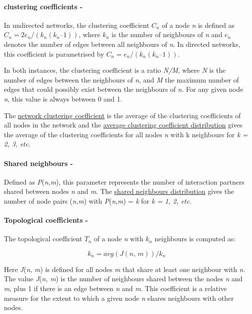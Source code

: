 \paragraph{clustering coefficients -}

In undirected networks, the clustering coefficient $C_n$ of a node \textit{n} is defined as $C_n = 2e_n/(k_n(k_n–1))$, where $k_n$ is the number of neighbours of \textit{n} and $e_n$ denotes the number of edges between all neighbours of \textit{n}. In directed networks, this coefficient is parametrised by $C_n = e_n/(k_n(k_n–1))$. 

In both instances, the clustering coefficient is a ratio \textit{N/M}, where \textit{N} is the number of edges between the neighbours of \textit{n}, and \textit{M} the maximum number of edges that could possibly exist between the neighbours of \textit{n}. For any given node \textit{n}, this value is always between 0 and 1. 

The \underline{network clustering coefficient} is the average of the clustering coefficients of all nodes in the network and the \underline{average clustering coefficient distribution} gives the average of the clustering coefficients for all nodes \textit{n} with k neighbours for \textit{k = 2, 3, etc}.  

\paragraph{Shared neighbours -}

Defined as \textit{P}(\textit{n,m}), this parameter represents the number of interaction partners shared between nodes \textit{n} and \textit{m}. The \underline{shared neighbours distribution} gives the number of node pairs (\textit{n,m}) with \textit{P}(\textit{n,m}) = \textit{k} for \textit{k = 1, 2, etc}. 

\paragraph{Topological coefficients -}

The topological coefficient $\textit{T}_n$ of a node \textit{n} with $\textit{k}_n$ neighbours is computed as: 

\begin{equation}
\textit{k}_n = avg (\textit{J}(\textit{n, m}))/\textit{k}_n
\end{equation}

Here \textit{J}(\textit{n, m}) is defined for all nodes \textit{m} that share at least one neighbour with \textit{n}. 
The value \textit{J}(\textit{n, m}) is the number of neighbours shared between the nodes \textit{n} and \textit{m}, plus 1 if there is an edge between \textit{n} and \textit{m}. This coefficient is a relative measure for the extent to which a given node \textit{n} shares neighbours with other nodes. 

